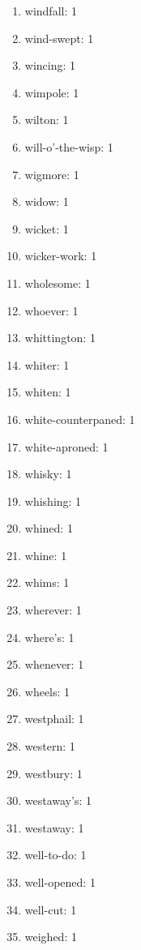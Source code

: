 \documentclass[12pt]{article}
\begin{document}
\begin{enumerate}
\item windfall: 1
\item wind-swept: 1
\item wincing: 1
\item wimpole: 1
\item wilton: 1
\item will-o'-the-wisp: 1
\item wigmore: 1
\item widow: 1
\item wicket: 1
\item wicker-work: 1
\item wholesome: 1
\item whoever: 1
\item whittington: 1
\item whiter: 1
\item whiten: 1
\item white-counterpaned: 1
\item white-aproned: 1
\item whisky: 1
\item whishing: 1
\item whined: 1
\item whine: 1
\item whims: 1
\item wherever: 1
\item where's: 1
\item whenever: 1
\item wheels: 1
\item westphail: 1
\item western: 1
\item westbury: 1
\item westaway's: 1
\item westaway: 1
\item well-to-do: 1
\item well-opened: 1
\item well-cut: 1
\item weighed: 1
\end{enumerate}
\end{document}
